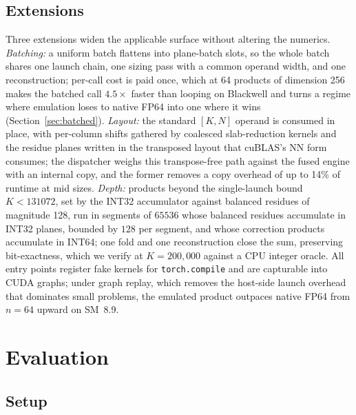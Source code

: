 \documentclass[11pt]{amsart}
\theoremstyle{plain}
\theoremstyle{definition}
\newcommand{\code}[1]{\texttt{#1}}
\begin{document}
\subsection{Extensions}\label{sec:extensions}

Three extensions widen the applicable surface without altering the
numerics. \emph{Batching:} a uniform batch flattens into plane-batch
slots, so the whole batch shares one launch chain, one sizing pass with a
common operand width, and one reconstruction; per-call cost is paid once,
which at 64 products of dimension 256 makes the batched call
$4.5\times$ faster than looping on Blackwell and turns a regime where
emulation loses to native FP64 into one where it wins
(Section~\ref{sec:batched}). \emph{Layout:} the standard $[K, N]$ operand
is consumed in place, with per-column shifts gathered by coalesced
slab-reduction kernels and the residue planes written in the transposed
layout that cuBLAS's NN form consumes; the dispatcher weighs this
transpose-free path against the fused engine with an internal copy, and
the former removes a copy overhead of up to 14\% of runtime at mid sizes.
\emph{Depth:} products beyond the single-launch bound $K < 131072$, set
by the INT32 accumulator against balanced residues of magnitude 128, run
in segments of $65536$ whose balanced residues accumulate in INT32 planes,
bounded by $128$ per segment, and whose correction products accumulate in
INT64; one fold and one reconstruction close the sum, preserving
bit-exactness, which we verify at $K = 200{,}000$ against a CPU integer
oracle. All entry points register fake kernels for \code{torch.compile}
and are capturable into CUDA graphs; under graph replay, which removes the
host-side launch overhead that dominates small problems, the emulated
product outpaces native FP64 from $n = 64$ upward on SM~8.9.

\section{Evaluation}\label{sec:eval}

\subsection{Setup}
\end{document}
